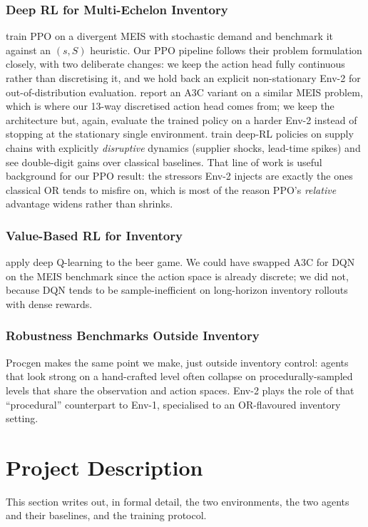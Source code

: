 \documentclass[letterpaper]{article} %
\begin{document}
\subsubsection{Deep RL for Multi-Echelon Inventory}
\citet{geevers2024multi} train PPO on a divergent MEIS with
stochastic demand and benchmark it against an $(s,S)$ heuristic.
Our PPO pipeline follows their problem formulation closely, with
two deliberate changes: we keep the action head fully continuous
rather than discretising it, and we hold back an explicit
non-stationary Env-2 for out-of-distribution evaluation.
\citet{hammler2022multi} report an A3C variant on a similar MEIS
problem, which is where our 13-way discretised action head comes
from; we keep the architecture but, again, evaluate the trained
policy on a harder Env-2 instead of stopping at the stationary
single environment.  \citet{lu2025dynamic} train deep-RL policies
on supply chains with explicitly \emph{disruptive} dynamics
(supplier shocks, lead-time spikes) and see double-digit gains
over classical baselines.  That line of work is useful background
for our PPO result: the stressors Env-2 injects are exactly the
ones classical OR tends to misfire on, which is most of the
reason PPO's \emph{relative} advantage widens rather than
shrinks.

\subsubsection{Value-Based RL for Inventory}
\citet{oroojlooyjadid2022deep} apply deep Q-learning to the beer
game.  We could have swapped A3C for DQN on the MEIS benchmark
since the action space is already discrete; we did not, because
DQN tends to be sample-inefficient on long-horizon inventory
rollouts with dense rewards.

\subsubsection{Robustness Benchmarks Outside Inventory}
Procgen \citep{cobbe2020procgen} makes the same point we make,
just outside inventory control: agents that look strong on a
hand-crafted level often collapse on procedurally-sampled levels
that share the observation and action spaces.  Env-2 plays the
role of that ``procedural'' counterpart to Env-1, specialised to
an OR-flavoured inventory setting.

\section{Project Description}
\label{sec:proj}
This section writes out, in formal detail, the two environments,
the two agents and their baselines, and the training protocol.
\end{document}
